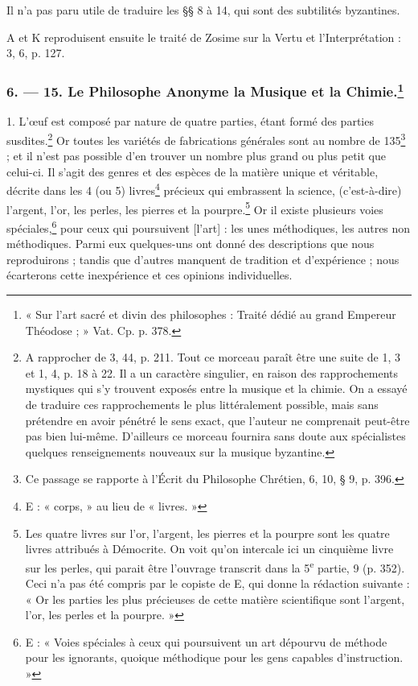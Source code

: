 \documentclass[a4paper, 11pt, oneside, polutonikogreek, french]{article}
\begin{document}
Il n'a pas paru utile de traduire les §§ 8 à 14, qui sont des subtilités byzantines.

A et K reproduisent ensuite le traité de Zosime sur la Vertu et l'Interprétation : 3, 6, p. 127.

\bigskip
\centerline{\EightStarTaper}
\centerline{\EightStarTaper\EightStarTaper}
\bigskip

\subsubsection[6. --- 15. Le Philosophe Anonyme la Musique et la Chimie.]{6. --- 15. Le Philosophe Anonyme la Musique et la Chimie.\footnote{« Sur l'art sacré et divin des philosophes : Traité dédié au grand Empereur Théodose ; » Vat. Cp. p. 378.}}

1. L'œuf est composé par nature de quatre parties, étant formé des parties susdites.\footnote{A rapprocher de 3, 44, p. 211. Tout ce morceau paraît être une suite de 1, 3 et 1, 4, p. 18 à 22. Il a un caractère singulier, en raison des rapprochements mystiques qui s'y trouvent exposés entre la musique et la chimie. On a essayé de traduire ces rapprochements le plus littéralement possible, mais sans prétendre en avoir pénétré le sens exact, que l'auteur ne comprenait peut-être pas bien lui-même. D'ailleurs ce morceau fournira sans doute aux spécialistes quelques renseignements nouveaux sur la musique byzantine.} Or toutes les variétés de fabrications générales sont au nombre de 135\footnote{Ce passage se rapporte à l'Écrit du Philosophe Chrétien, 6, 10, § 9, p. 396.} ; et il n'est pas possible d'en trouver un nombre plus grand ou plus petit que celui-ci. Il s'agit des genres et des espèces de la matière unique et véritable, décrite dans les 4 (ou 5) livres\footnote{E : « corps, » au lieu de « livres. »} précieux qui embrassent la science, (c'est-à-dire) l'argent, l'or, les perles, les pierres et la pourpre.\footnote{Les quatre livres sur l'or, l'argent, les pierres et la pourpre sont les quatre livres attribués à Démocrite. On voit qu'on intercale ici un cinquième livre sur les perles, qui parait être l'ouvrage transcrit dans la 5\textsuperscript{e} partie, 9 (p. 352). Ceci n'a pas été compris par le copiste de E, qui donne la rédaction suivante : « Or les parties les plus précieuses de cette matière scientifique sont l'argent, l'or, les perles et la pourpre. »} Or il existe plusieurs voies spéciales,\footnote{E : « Voies spéciales à ceux qui poursuivent un art dépourvu de méthode pour les ignorants, quoique méthodique pour les gens capables d'instruction. »} pour ceux qui poursuivent [l'art] : les unes méthodiques, les autres non méthodiques. Parmi eux quelques-uns ont donné des descriptions que nous reproduirons ; tandis que d'autres manquent de tradition et d'expérience ; nous écarterons cette inexpérience et ces opinions individuelles.
\end{document}
